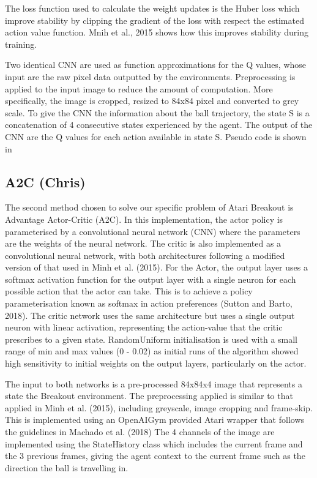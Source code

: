 \documentclass{article}
\begin{document}
The loss function used to calculate the weight updates is the Huber loss which improve stability by clipping the gradient of the loss with respect the estimated action value function. Mnih et al., 2015 shows how this improves stability during training.

Two identical CNN are used as function approximations for the Q values, whose input are the raw pixel data outputted by the environments. Preprocessing is applied to the input image to reduce the amount of computation. More specifically, the image is cropped, resized to 84x84 pixel and converted to grey scale. To give the CNN the information about the ball trajectory, the state S is a concatenation of 4 consecutive states experienced by the agent. The output of the CNN are the Q values for each action available in state S.
Pseudo code is shown in 

\subsection{A2C (Chris)}

The second method chosen to solve our specific problem of Atari Breakout is Advantage Actor-Critic (A2C). In this implementation, the actor policy is parameterised by a convolutional neural network (CNN) where the parameters are the weights of the neural network. The critic is also implemented as a convolutional neural network, with both architectures following a modified version of that used in Minh et al. (2015). For the Actor, the output layer uses a softmax activation function for the output layer with a single neuron for each possible action that the actor can take. This is to achieve a policy parameterisation known as softmax in action preferences (Sutton and Barto, 2018). The critic network uses the same architecture but uses a single output neuron with linear activation, representing the action-value that the critic prescribes to a given state. RandomUniform initialisation is used with a small range of min and max values (0 - 0.02) as initial runs of the algorithm showed high sensitivity to initial weights on the output layers, particularly on the actor.

The input to both networks is a pre-processed 84x84x4 image that represents a state the Breakout environment. The preprocessing applied is similar to that applied in Minh et al. (2015), including greyscale, image cropping and frame-skip. This is implemented using an OpenAIGym provided Atari wrapper that follows the guidelines in Machado et al. (2018) The 4 channels of the image are implemented using the StateHistory class which includes the current frame and the 3 previous frames, giving the agent context to the current frame such as the direction the ball is travelling in.
\end{document}
